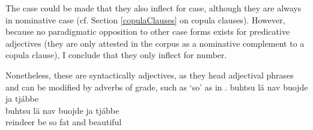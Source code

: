 The case could be made that they also inflect for case, although they are always in nominative case (cf. Section \ref{copulaClauses} on copula clauses). %
However, because no paradigmatic opposition to other case forms exists for predicative adjectives (they are only attested in the corpus as a nominative complement to a copula clause), I conclude that they only inflect for number. 

Nonetheless, these are syntactically adjectives, as they head adjectival phrases and can be modified by adverbs of grade, such as  ‘so’ as in .
\ea\label{adjPredEx3}
\glll	buhtsu lä nav buojde ja tjábbe\\
	buhtsu lä nav buojde ja tjábbe\\
	reindeer\BS{} be\BS{} so fat\BS{} and beautiful\BS{}\\\nopagebreak
{}	
\z

